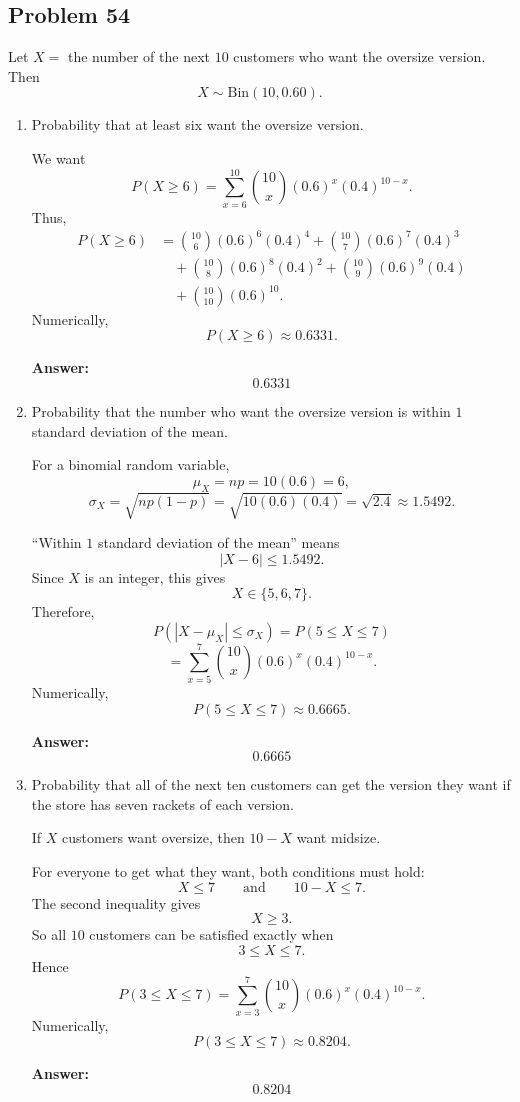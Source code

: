 \documentclass[11pt]{article}
\begin{document}
\subsection*{Problem 54}

Let \(X=\) the number of the next \(10\) customers who want the oversize version. Then
\[
X\sim \mathrm{Bin}(10,0.60).
\]

\begin{enumerate}
    \item[(a)] Probability that at least six want the oversize version.

    We want
    \[
    P(X\ge 6)=\sum_{x=6}^{10}\binom{10}{x}(0.6)^x(0.4)^{10-x}.
    \]
    Thus,
    \[
    \begin{aligned}
    P(X\ge 6)
    &=\binom{10}{6}(0.6)^6(0.4)^4
    +\binom{10}{7}(0.6)^7(0.4)^3 \\
    &\quad +\binom{10}{8}(0.6)^8(0.4)^2
    +\binom{10}{9}(0.6)^9(0.4) \\
    &\quad +\binom{10}{10}(0.6)^{10}.
    \end{aligned}
    \]
    Numerically,
    \[
    P(X\ge 6)\approx 0.6331.
    \]

    \textbf{Answer:}
    \[
    \boxed{0.6331}
    \]

    \item[(b)] Probability that the number who want the oversize version is within \(1\) standard deviation of the mean.

    For a binomial random variable,
    \[
    \mu_X=np=10(0.6)=6,
    \]
    \[
    \sigma_X=\sqrt{np(1-p)}=\sqrt{10(0.6)(0.4)}=\sqrt{2.4}\approx 1.5492.
    \]

    “Within \(1\) standard deviation of the mean” means
    \[
    |X-6|\le 1.5492.
    \]
    Since \(X\) is an integer, this gives
    \[
    X\in\{5,6,7\}.
    \]
    Therefore,
    \[
    P(|X-\mu_X|\le \sigma_X)=P(5\le X\le 7)
    \]
    \[
    =\sum_{x=5}^{7}\binom{10}{x}(0.6)^x(0.4)^{10-x}.
    \]
    Numerically,
    \[
    P(5\le X\le 7)\approx 0.6665.
    \]

    \textbf{Answer:}
    \[
    \boxed{0.6665}
    \]

    \item[(c)] Probability that all of the next ten customers can get the version they want if the store has seven rackets of each version.

    If \(X\) customers want oversize, then \(10-X\) want midsize.

    For everyone to get what they want, both conditions must hold:
    \[
    X\le 7
    \qquad \text{and} \qquad
    10-X\le 7.
    \]
    The second inequality gives
    \[
    X\ge 3.
    \]
    So all \(10\) customers can be satisfied exactly when
    \[
    3\le X\le 7.
    \]
    Hence
    \[
    P(3\le X\le 7)=\sum_{x=3}^{7}\binom{10}{x}(0.6)^x(0.4)^{10-x}.
    \]
    Numerically,
    \[
    P(3\le X\le 7)\approx 0.8204.
    \]

    \textbf{Answer:}
    \[
    \boxed{0.8204}
    \]
\end{enumerate}
\end{document}
